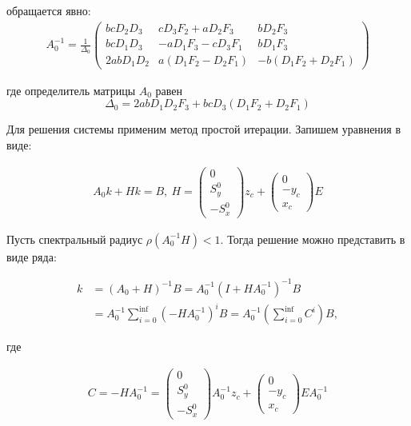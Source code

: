 обращается явно:
\begin{equation}
\begin{aligned}
	A_0^{-1} = \frac{1}{\Delta_0}\begin{pmatrix}
	bcD_2D_3 & cD_3F_2 + aD_2F_3 & bD_2F_3 \\
	bcD_1D_3 & -aD_1F_3-cD_3F_1 & bD_1F_3 \\
	2abD_1D_2 & a\left(D_1F_2-D_2F_1\right) & -b\left(D_1F_2 + D_2F_1\right)
\end{pmatrix}
\end{aligned}
\end{equation}

где определитель матрицы $A_0$ равен
\begin{equation}
	\Delta_0 = 2abD_1D_2F_3 + bcD_3\left(D_1F_2 + D_2F_1\right)
\end{equation}

Для решения системы применим метод простой итерации. Запишем уравнения в виде:

\begin{equation}
\begin{aligned}
	A_0k + Hk = B, ~ H = \begin{pmatrix}0 \\ S_y^0 \\ -S_x^0 \end{pmatrix}z_c + \begin{pmatrix}0 \\ -y_c \\ x_c \end{pmatrix}E
\end{aligned}
\end{equation}

Пусть спектральный радиус $\rho\left(A_0^{-1}H\right) < 1$. Тогда решение можно представить в виде ряда:

\begin{equation}
\begin{aligned}
	k & = \left(A_0 + H\right)^{-1}B = A_0^{-1}\left(I + HA_0^{-1}\right)^{-1}B \\
	&= A_0^{-1}\sum_{i=0}^{\inf}\left(-HA_0^{-1}\right)^i B = A_0^{-1}\left(\sum_{i=0}^{\inf}C^i\right)B,
\end{aligned}
\end{equation}

где

\begin{equation}
\begin{aligned}
	C = -H A_0^{-1} = \begin{pmatrix}0 \\ S_y^0 \\ -S_x^0 \end{pmatrix}A_0^{-1}z_c + \begin{pmatrix}0 \\ -y_c \\ x_c \end{pmatrix}EA_0^{-1}
\end{aligned}
\end{equation}

